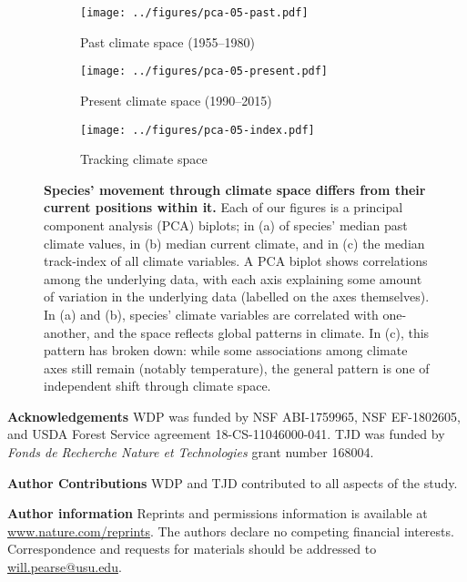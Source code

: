\documentclass[12pt]{report}
\begin{document}
\clearpage
\begin{figure}[h!]
  \begin{center}
    \begin{subfigure}{.45\textwidth}
      \texttt{[image: ../figures/pca-05-past.pdf]}
      \caption{Past climate space (1955--1980)}
    \end{subfigure}
    \begin{subfigure}{.45\textwidth}
      \texttt{[image: ../figures/pca-05-present.pdf]}
      \caption{Present climate space (1990--2015)}
    \end{subfigure}
    \begin{subfigure}{.45\textwidth}
      \texttt{[image: ../figures/pca-05-index.pdf]}
      \caption{Tracking climate space}
    \end{subfigure}
  \end{center}
  \caption{\doublespacing \textbf{Species' movement through climate
      space differs from their current positions within it.} Each of
    our figures is a principal component analysis (PCA) biplots; in
    (a) of species' median past climate values, in (b) median current
    climate, and in (c) the median track-index of all climate
    variables. A PCA biplot shows correlations among the underlying
    data, with each axis explaining some amount of variation in the
    underlying data (labelled on the axes themselves). In (a) and (b),
    species' climate variables are correlated with one-another, and
    the space reflects global patterns in climate. In (c), this
    pattern has broken down: while some associations among climate
    axes still remain (notably temperature), the general pattern is
    one of independent shift through climate space.}
  \label{pca}
\end{figure}

\clearpage

\textbf{Acknowledgements} WDP was funded by NSF ABI-1759965, NSF
EF-1802605, and USDA Forest Service agreement 18-CS-11046000-041. TJD
was funded by \emph{Fonds de Recherche Nature et Technologies} grant
number 168004.

\textbf{Author Contributions} WDP and TJD contributed to all aspects
of the study.

\textbf{Author information} Reprints and permissions information is
available at \url{www.nature.com/reprints}. The authors declare no
competing financial interests. Correspondence and requests for
materials should be addressed to \url{will.pearse@usu.edu}.
\end{document}
